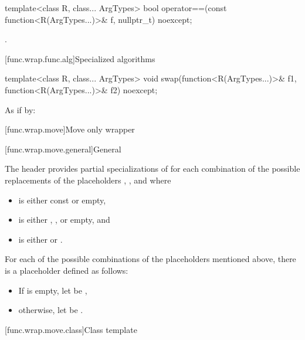 %
\begin{itemdecl}
template<class R, class... ArgTypes>
  bool operator==(const function<R(ArgTypes...)>& f, nullptr_t) noexcept;
\end{itemdecl}

\begin{itemdescr}
\pnum
\returns
{}.
\end{itemdescr}

[func.wrap.func.alg]{Specialized algorithms}

%
\begin{itemdecl}
template<class R, class... ArgTypes>
  void swap(function<R(ArgTypes...)>& f1, function<R(ArgTypes...)>& f2) noexcept;
\end{itemdecl}

\begin{itemdescr}
\pnum
\effects
As if by: 
\end{itemdescr}%

[func.wrap.move]{Move only wrapper}

[func.wrap.move.general]{General}

\pnum
The header provides partial specializations of 
for each combination of the possible replacements
of the placeholders \cv{}, , and  where
\begin{itemize}
\item
\cv{} is either const or empty,
\item
{} is either \tcode{\&}, \tcode{\&\&}, or empty, and
\item
{} is either  or .
\end{itemize}

\pnum
For each of the possible combinations of the placeholders mentioned above,
there is a placeholder  defined as follows:
\begin{itemize}
\item
If  is empty, let  be \tcode{\cv{}\&},
\item
otherwise, let  be \cv{} .
\end{itemize}

[func.wrap.move.class]{Class template }

